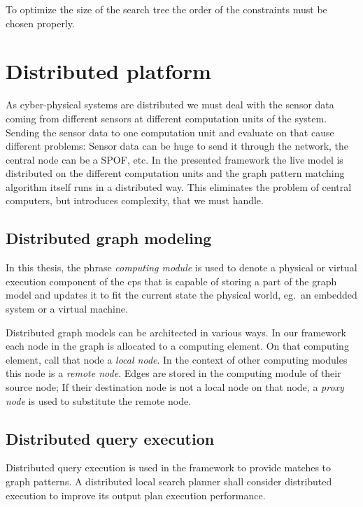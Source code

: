 To optimize the size of the search tree the order of the constraints must be chosen properly. 

\section{Distributed platform}


As cyber-physical systems are distributed we must deal with the sensor data coming from different sensors at different computation units of the system. 
Sending the sensor data to one computation unit and evaluate on that cause different problems: 
Sensor data can be huge to send it through the network, the central node can be a SPOF, etc. 
In the presented framework the live model is distributed on the different computation units and the graph pattern matching algorithm itself runs in a distributed way. 
This eliminates the problem of central computers, but introduces complexity, that we must handle.

\subsection{Distributed graph modeling}

In this thesis, the phrase \emph{computing module} is used to denote a physical or virtual execution component of the cps that is capable of storing a part of the graph model and updates it to fit the current state the physical world, eg.\ an embedded system or a virtual machine.

Distributed graph models can be architected in various ways. 
In our framework each node in the graph is allocated to a computing element. 
On that computing element, call that node a \emph{local node}. 
In the context of other computing modules this node is a \emph{remote node}. 
Edges are stored in the computing module of their source node; 
If their destination node is not a local node on that node, a \emph{proxy node} is used to substitute the remote node.

\subsection{Distributed query execution}

Distributed query execution is used in the framework to provide matches to graph patterns. 
A distributed local search planner shall consider distributed execution to improve its output plan execution performance.







